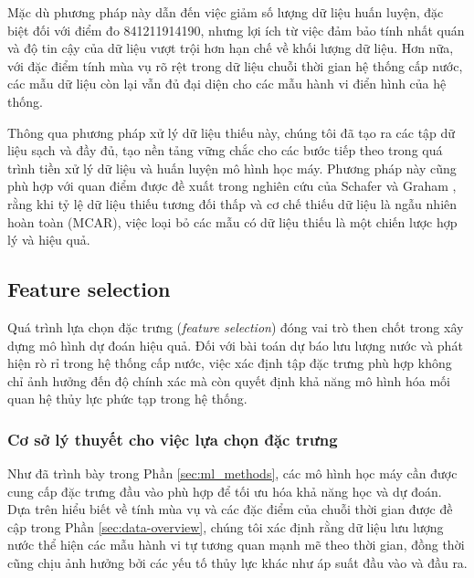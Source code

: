 Mặc dù phương pháp này dẫn đến việc giảm số lượng dữ liệu huấn luyện, đặc biệt đối với điểm đo 841211914190, nhưng lợi ích từ việc đảm bảo tính nhất quán và độ tin cậy của dữ liệu vượt trội hơn hạn chế về khối lượng dữ liệu. Hơn nữa, với đặc điểm tính mùa vụ rõ rệt trong dữ liệu chuỗi thời gian hệ thống cấp nước, các mẫu dữ liệu còn lại vẫn đủ đại diện cho các mẫu hành vi điển hình của hệ thống.


Thông qua phương pháp xử lý dữ liệu thiếu này, chúng tôi đã tạo ra các tập dữ liệu sạch và đầy đủ, tạo nền tảng vững chắc cho các bước tiếp theo trong quá trình tiền xử lý dữ liệu và huấn luyện mô hình học máy. Phương pháp này cũng phù hợp với quan điểm được đề xuất trong nghiên cứu của Schafer và Graham \cite{schafer2002missing}, rằng khi tỷ lệ dữ liệu thiếu tương đối thấp và cơ chế thiếu dữ liệu là ngẫu nhiên hoàn toàn (MCAR), việc loại bỏ các mẫu có dữ liệu thiếu là một chiến lược hợp lý và hiệu quả.

\subsection{Feature selection}

Quá trình lựa chọn đặc trưng (\textit{feature selection}) đóng vai trò then chốt trong xây dựng mô hình dự đoán hiệu quả. Đối với bài toán dự báo lưu lượng nước và phát hiện rò rỉ trong hệ thống cấp nước, việc xác định tập đặc trưng phù hợp không chỉ ảnh hưởng đến độ chính xác mà còn quyết định khả năng mô hình hóa mối quan hệ thủy lực phức tạp trong hệ thống.

\subsubsection{Cơ sở lý thuyết cho việc lựa chọn đặc trưng}

Như đã trình bày trong Phần \ref{sec:ml_methods}, các mô hình học máy cần được cung cấp đặc trưng đầu vào phù hợp để tối ưu hóa khả năng học và dự đoán. Dựa trên hiểu biết về tính mùa vụ và các đặc điểm của chuỗi thời gian được đề cập trong Phần \ref{sec:data-overview}, chúng tôi xác định rằng dữ liệu lưu lượng nước thể hiện các mẫu hành vi tự tương quan mạnh mẽ theo thời gian, đồng thời cũng chịu ảnh hưởng bởi các yếu tố thủy lực khác như áp suất đầu vào và đầu ra.

